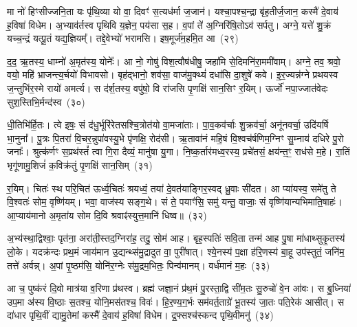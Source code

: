 {\anuvakamend[{रपः॑ पत॒त्रिणी॒र्या अꣳह॑सो॒ याः खना॑मि वो॒\-ऽष्टाद॑श च}]}%

मा नो॑ हिꣳसीज्जनि॒ता यः पृ॑थि॒व्या यो वा॒ दिवꣳ॑ स॒त्यध॑र्मा ज॒जान॑। यश्चा॒पश्च॒न्द्रा बृ॑ह॒तीर्ज॒जान॒ कस्मै॑ दे॒वाय॑ ह॒विषा॑ विधेम। अ॒भ्याव॑र्तस्व पृथिवि य॒ज्ञेन॒ पय॑सा स॒ह। व॒पां ते॑ अ॒ग्निरि॑षि॒तो\-ऽव॑ सर्पतु। अग्ने॒ यत्ते॑ शु॒क्रं यच्च॒न्द्रं यत्पू॒तं यद्य॒ज्ञियम्᳚। तद्दे॒वेभ्यो॑ भरामसि। इष॒मूर्ज॑म॒हमि॒त आ~(२९)

द॒द॒ ऋ॒तस्य॒ धाम्नो॑ अ॒मृत॑स्य॒ योनेः᳚। आ नो॒ गोषु॑ विश॒त्वौष॑धीषु॒ जहा॑मि से॒दिमनि॑रा॒ममी॑वाम्। अग्ने॒ तव॒ श्रवो॒ वयो॒ महि॑ भ्राजन्त्य॒र्चयो॑ विभावसो। बृह॑द्भानो॒ शव॑सा॒ वाज॑मु॒क्थ्यं॑ दधा॑सि दा॒शुषे॑ कवे। इ॒र॒ज्यन्न॑ग्ने प्रथयस्व ज॒न्तुभि॑र॒स्मे रायो॑ अमर्त्य। स द॑र्\mbox{}श॒तस्य॒ वपु॑षो॒ वि रा॑जसि पृ॒णक्षि॑ सान॒सिꣳ र॒यिम्। ऊर्जो॑ नपा॒ज्जात॑वेदः सुश॒स्तिभि॒र्मन्द॑स्व~(३०)

धी॒तिभि॑र्हि॒तः। त्वे इषः॒ सं द॑धु॒र्भूरि॑रेतसश्चि॒त्रोत॑यो वा॒मजा॑ताः। पा॒व॒कव॑र्चाः शु॒क्रव॑र्चा॒ अनू॑नवर्चा॒ उदि॑यर्\mbox{}षि भा॒नुना᳚। पु॒त्रः पि॒तरा॑ वि॒चर॒न्नुपा॑वस्यु॒भे पृ॑णक्षि॒ रोद॑सी। ऋ॒तावा॑नं महि॒षं वि॒श्वच॑र्\mbox{}षणिम॒ग्निꣳ सु॒म्नाय॑ दधिरे पु॒रो जनाः᳚। श्रुत्क॑र्णꣳ स॒प्रथ॑स्तं᳚ त्वा गि॒रा दैव्यं॒ मानु॑षा यु॒गा। नि॒ष्क॒र्तार॑मध्व॒रस्य॒ प्रचे॑तसं॒ क्षय॑न्त॒ꣳ॒ राध॑से म॒हे। रा॒तिं भृगू॑णामु॒शिजं॑ क॒विक्र॑तुं पृ॒णक्षि॑ सान॒सिम्~(३१)

र॒यिम्। चितः॑ स्थ परि॒चित॑ ऊर्ध्व॒चितः॑ श्रयध्वं॒ तया॑ दे॒वत॑याङ्गिर॒स्वद् ध्रु॒वाः सी॑दत। आ प्या॑यस्व॒ समे॑तु ते वि॒श्वतः॑ सोम॒ वृष्णि॑यम्। भवा॒ वाज॑स्य सङ्ग॒थे। सं ते॒ पयाꣳ॑सि॒ समु॑ यन्तु॒ वाजाः॒ सं वृष्णि॑यान्यभिमाति॒षाहः॑। आ॒प्याय॑मानो अ॒मृता॑य सोम दि॒वि श्रवाꣴ॑स्युत्त॒मानि॑ धिष्व॥~(३२)

{\anuvakamend[{आ मन्द॑स्व सान॒सिमेका॒न्नच॑त्वारि॒ꣳ॒शच्च॑}]}%

अ॒भ्य॑स्था॒द्विश्वाः॒ पृत॑ना॒ अरा॑ती॒स्तद॒ग्निरा॑ह॒ तदु॒ सोम॑ आह। बृह॒स्पतिः॑ सवि॒ता तन्म॑ आह पु॒षा मा॑धाथ्सुकृ॒तस्य॑ लो॒के। यदक्र॑न्दः प्रथ॒मं जाय॑मान उ॒द्यन्थ्स॑मु॒द्रादुत वा॒ पुरी॑षात्। श्ये॒नस्य॑ प॒क्षा ह॑रि॒णस्य॑ बा॒हू उप॑स्तुतं॒ जनि॑म॒ तत्ते॑ अर्वन्न्। अ॒पां पृ॒ष्ठम॑सि॒ योनि॑र॒ग्नेः स॑मु॒द्रम॒भितः॒ पिन्व॑मानम्। वर्ध॑मानं म॒हः~(३३)

आ च॒ पुष्क॑रं दि॒वो मात्र॑या व॒रिणा प्र॑थस्व। ब्रह्म॑ जज्ञा॒नं प्र॑थ॒मं पु॒रस्ता॒द्वि सी॑म॒तः सु॒रुचो॑ वे॒न आ॑वः। स बु॒ध्निया॑ उप॒मा अ॑स्य वि॒ष्ठाः स॒तश्च॒ योनि॒मस॑तश्च॒ विवः॑। हि॒र॒ण्य॒ग॒र्भः सम॑वर्त॒ताग्रे॑ भू॒तस्य॑ जा॒तः पति॒रेक॑ आसीत्। स दा॑धार पृथि॒वीं द्यामु॒तेमां कस्मै॑ दे॒वाय॑ ह॒विषा॑ विधेम। द्र॒फ्सश्च॑स्कन्द पृथि॒वीमनु॑~(३४)

